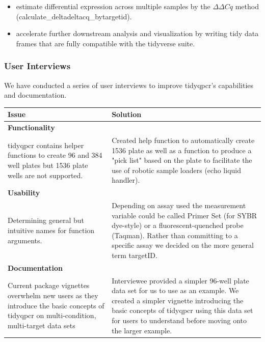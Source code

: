 \documentclass{SBCbookchapter}
\begin{document}
\begin{itemize}
    \item estimate differential expression across multiple samples by the $\Delta \Delta Cq$ method (calculate\_deltadeltacq\_bytargetid).
    \item accelerate further downstream analysis and visualization by writing tidy data frames that are fully compatible with the tidyverse suite.

\end{itemize}

\subsubsection{User Interviews}
We have conducted a series of user interviews to improve tidyqpcr's capabilities and documentation.

\begin{center}
\begin{tabular}{|| m{5.5cm} | m{8cm} ||} 
 \hline
 \textbf{\large Issue} & \textbf{\large Solution} \\ [0.5ex] 
 \hline\hline
 \multicolumn{2}{|l|}{\textbf{Functionality}} \\
 \hline
 tidyqpcr contains helper functions to create 96 and 384 well plates but 1536 plate wells are not supported. & Created help function to automatically create 1536 plate as well as a function to produce a "pick list" based on the plate to facilitate the use of robotic sample loaders (echo liquid handler). \\ 
 \hline
 \multicolumn{2}{|l|}{\textbf{Usability}} \\
 \hline
 Determining general but intuitive names for function arguments. & Depending on assay used the measurement variable could be called Primer Set (for SYBR dye-style) or a fluorescent-quenched probe (Taqman). Rather than committing to a specific assay we decided on the more general term targetID. \\
 \hline
 \multicolumn{2}{|l|}{\textbf{Documentation}} \\
 \hline
 Current package vignettes overwhelm new users as they introduce the basic concepts of tidyqpcr on multi-condition, multi-target data sets & Interviewee provided a simpler 96-well plate data set for us to use as an example. We created a simpler vignette introducing the basic concepts of tidyqpcr using this data set for users to understand before moving onto the larger example. \\
 \hline
\end{tabular}
\end{center}
\end{document}
